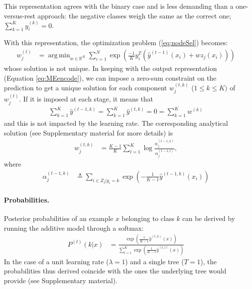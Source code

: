 \documentclass{article}
\DeclareMathOperator*{\argmin}{arg\,min}
\begin{document}
This representation agrees with the binary case and is less demanding than a 
one-versus-rest approach: the negative classes weigh the same as the correct 
one; $\sum_{k=1}^{K} y_i^{(k)} = 0$.

With this representation, the optimization problem (\ref{eq:nodeSel}) becomes:
\begin{align}\label{eq:MEmin}
w_j^{(t)} &=  \argmin_{w \in \mathbb{R}^K} \sum_{i=1}^N \exp 
\left(\frac{-1}{K} y_i^T \left(\hat{y}^{(t-1)}(x_i) + w z_j(x_i) \right)\right)
\end{align}
whose solution is not unique.
In keeping with the output representation (Equation \ref{eq:MEencode}), we can 
impose a zero-sum constraint on the prediction to get a unique solution for 
each component $w_j^{(t,k)}$ ($1\leq k \leq K)$ of $w_j^{(t)}$. If it is 
imposed at each stage, it means that
\begin{align}\label{eq:MEzeroSum}
\sum_{k=1}^{K} \hat{y}^{(t-1, k)} = \sum_{k=1}^{K} 
\hat{y}^{(t, k)} = 0 = \sum_{k=1}^{K} w^{(k)}
\end{align}
and this is not impacted by the learning rate. The corresponding analytical solution (see 
Supplementary material for more details) is
\begin{align}\label{eq:MEsolution}
w_j^{(t,k)} &= \frac{K-1}{K}  \sum_{l=1}^{K} \log \frac{\alpha_j^{(t-1, 
k)}}{\alpha_j^{(t-1, l)}},
\end{align}
where
\begin{align}\label{eq:MEClsErrZS}
\alpha_j^{(t-1, k)} &\triangleq \sum_{i \in Z_j|y_i=k} \exp \left( 
-\frac{1}{K-1} \hat{y}^{(t-1, k)}(x_i) \right) 
\end{align}

\paragraph{Probabilities.}
Posterior probabilities of an example $x$ belonging to class $k$ can be derived 
by running the additive model through a softmax:
\begin{align}\label{eq:MEproba}
P^{(t)}(k|x) &= \frac{\exp \left(\frac{1}{K-1} \hat{y}^{(t, k)}(x) 
\right)}{\sum_{l=1}^K\exp \left(\frac{1}{K-1} \hat{y}^{(t, l)}(x) \right)}
\end{align}
In the case of a unit learning rate ($\lambda = 1$) and a single tree ($T=1$), 
the probabilities thus derived coincide with the ones the underlying tree would 
provide (see Supplementary material).
\end{document}
